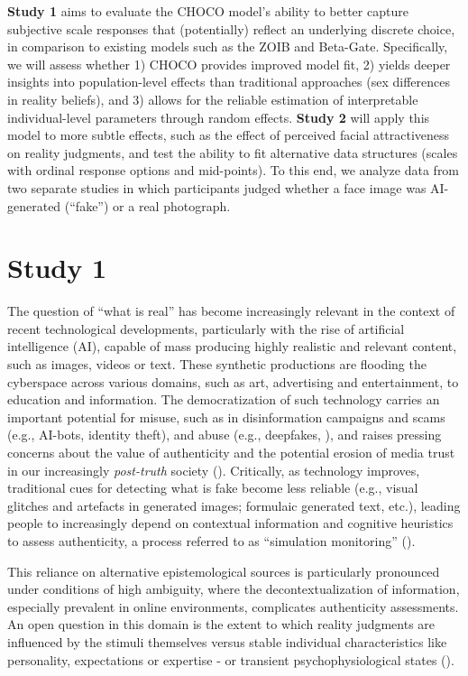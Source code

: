 \documentclass[
  jou,
  floatsintext,
  longtable,
  nolmodern,
  notxfonts,
  notimes,
  colorlinks=true,linkcolor=blue,citecolor=blue,urlcolor=blue]{apa7}
\begin{document}
\textbf{Study 1} aims to evaluate the CHOCO model's ability to better
capture subjective scale responses that (potentially) reflect an
underlying discrete choice, in comparison to existing models such as the
ZOIB and Beta-Gate. Specifically, we will assess whether 1) CHOCO
provides improved model fit, 2) yields deeper insights into
population-level effects than traditional approaches (sex differences in
reality beliefs), and 3) allows for the reliable estimation of
interpretable individual-level parameters through random effects.
\textbf{Study 2} will apply this model to more subtle effects, such as
the effect of perceived facial attractiveness on reality judgments, and
test the ability to fit alternative data structures (scales with ordinal
response options and mid-points). To this end, we analyze data from two
separate studies in which participants judged whether a face image was
AI-generated (``fake'') or a real photograph.

\section{Study 1}\label{study-1}

The question of ``what is real'' has become increasingly relevant in the
context of recent technological developments, particularly with the rise
of artificial intelligence (AI), capable of mass producing highly
realistic and relevant content, such as images, videos or text. These
synthetic productions are flooding the cyberspace across various
domains, such as art, advertising and entertainment, to education and
information. The democratization of such technology carries an important
potential for misuse, such as in disinformation campaigns and scams
(e.g., AI-bots, identity theft), and abuse (e.g., deepfakes,
), and raises
pressing concerns about the value of authenticity and the potential
erosion of media trust in our increasingly \emph{post-truth} society
().
Critically, as technology improves, traditional cues for detecting what
is fake become less reliable (e.g., visual glitches and artefacts in
generated images; formulaic generated text, etc.), leading people to
increasingly depend on contextual information and cognitive heuristics
to assess authenticity, a process referred to as ``simulation
monitoring'' ().

This reliance on alternative epistemological sources is particularly
pronounced under conditions of high ambiguity, where the
decontextualization of information, especially prevalent in online
environments, complicates authenticity assessments. An open question in
this domain is the extent to which reality judgments are influenced by
the stimuli themselves versus stable individual characteristics like
personality, expectations or expertise - or transient
psychophysiological states ().
\end{document}
